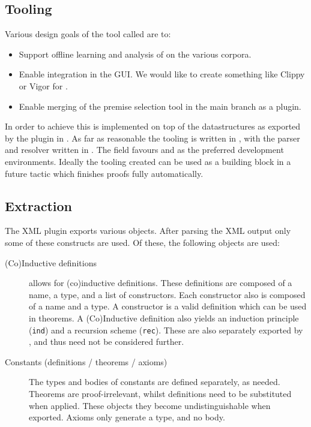 \subsection{Tooling}
Various design goals of the \premiseselection tool called \roerei are to:
\begin{itemize}
    \item Support offline learning and analysis of \machinelearning on the various corpora.
    \item Enable integration in the \coqide GUI.
    	We would like to create something like Clippy or Vigor for \coq.
    \item Enable merging of the premise selection tool in the \coq main branch as a plugin.
\end{itemize}
In order to achieve this \roerei is implemented on top of the \acic datastructures as exported by the \xml plugin in \coq.
As far as reasonable the \premiseselection tooling is written in \cpp, with the parser and resolver written in \ocaml.
The \machinelearning field favours \python and \matlab as the preferred development environments.
Ideally the tooling created can be used as a building block in a future \coq tactic which finishes proofs fully automatically.

\subsection{Extraction}
The \coq XML plugin exports various objects.
After parsing the XML output only some of these constructs are used.
Of these, the following \coq objects are used:
\begin{description}
    \item[(Co)Inductive definitions]
        \coq allows for (co)inductive definitions.
        These definitions are composed of a name, a type, and a list of constructors.
        Each constructor also is composed of a name and a type.
        A constructor is a valid definition which can be used in theorems.
		A (Co)Inductive definition also yields an induction principle (\texttt{ind}) and a recursion scheme (\texttt{rec}).
		These are also separately exported by \coq, and thus need not be considered further.

    \item[Constants (definitions / theorems / axioms)]
        The types and bodies of constants are defined separately, as needed.
        Theorems are proof-irrelevant, whilst definitions need to be substituted when applied.
        These objects they become undistinguishable when exported.
        Axioms only generate a type, and no body.
\end{description}

